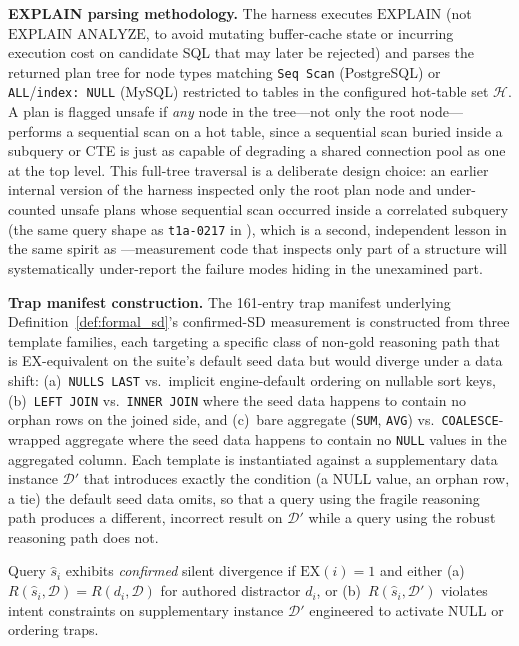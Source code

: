 \documentclass[twocolumn]{svjour3}
\begin{document}
\textbf{EXPLAIN parsing methodology.}
The harness executes $\text{EXPLAIN}$ (not $\text{EXPLAIN ANALYZE}$, to avoid mutating buffer-cache state or incurring execution cost on candidate SQL that may later be rejected) and parses the returned plan tree for node types matching \texttt{Seq Scan} (PostgreSQL) or \texttt{ALL}/\texttt{index: NULL} (MySQL) restricted to tables in the configured hot-table set $\mathcal{H}$.
A plan is flagged unsafe if \emph{any} node in the tree---not only the root node---performs a sequential scan on a hot table, since a sequential scan buried inside a subquery or CTE is just as capable of degrading a shared connection pool as one at the top level.
This full-tree traversal is a deliberate design choice: an earlier internal version of the harness inspected only the root plan node and under-counted unsafe plans whose sequential scan occurred inside a correlated subquery (the same query shape as \texttt{t1a-0217} in ), which is a second, independent lesson in the same spirit as ---measurement code that inspects only part of a structure will systematically under-report the failure modes hiding in the unexamined part.

\textbf{Trap manifest construction.}
The 161-entry trap manifest underlying Definition~\ref{def:formal_sd}'s confirmed-SD measurement is constructed from three template families, each targeting a specific class of non-gold reasoning path that is EX-equivalent on the suite's default seed data but would diverge under a data shift: (a)~\texttt{NULLS LAST} vs.\ implicit engine-default ordering on nullable sort keys, (b)~\texttt{LEFT JOIN} vs.\ \texttt{INNER JOIN} where the seed data happens to contain no orphan rows on the joined side, and (c)~bare aggregate (\texttt{SUM}, \texttt{AVG}) vs.\ \texttt{COALESCE}-wrapped aggregate where the seed data happens to contain no \texttt{NULL} values in the aggregated column.
Each template is instantiated against a supplementary data instance $\mathcal{D}'$ that introduces exactly the condition (a NULL value, an orphan row, a tie) the default seed data omits, so that a query using the fragile reasoning path produces a different, incorrect result on $\mathcal{D}'$ while a query using the robust reasoning path does not.

\begin{drdef}
\label{def:formal_sd}
Query $\hat{s}_i$ exhibits \emph{confirmed} silent divergence if $\text{EX}(i){=}1$ and either (a)~$R(\hat{s}_i,\mathcal{D})=R(d_i,\mathcal{D})$ for authored distractor $d_i$, or (b)~$R(\hat{s}_i,\mathcal{D}')$ violates intent constraints on supplementary instance $\mathcal{D}'$ engineered to activate NULL or ordering traps.
\end{drdef}
\end{document}
